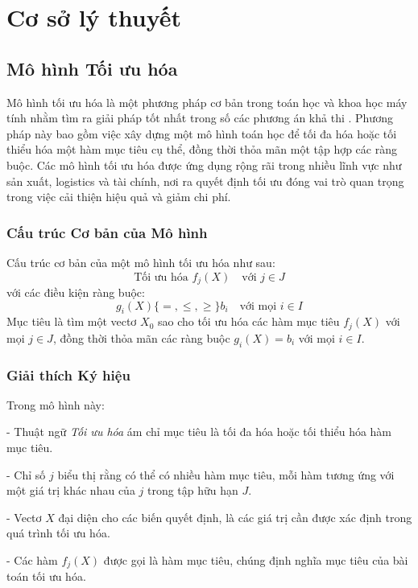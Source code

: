 \section{Cơ sở lý thuyết}
\subsection{Mô hình Tối ưu hóa}

\hspace{0.5cm}
Mô hình tối ưu hóa là một phương pháp cơ bản trong toán học và khoa học máy tính nhằm tìm ra giải pháp tốt nhất trong số các phương án khả thi \cite{GiordanoFoxHorton}. Phương pháp này bao gồm việc xây dựng một mô hình toán học để tối đa hóa hoặc tối thiểu hóa một hàm mục tiêu cụ thể, đồng thời thỏa mãn một tập hợp các ràng buộc. Các mô hình tối ưu hóa được ứng dụng rộng rãi trong nhiều lĩnh vực như sản xuất, logistics và tài chính, nơi ra quyết định tối ưu đóng vai trò quan trọng trong việc cải thiện hiệu quả và giảm chi phí.

\subsubsection{Cấu trúc Cơ bản của Mô hình}
\hspace{0.5cm}Cấu trúc cơ bản của một mô hình tối ưu hóa như sau:
\[
\text{Tối ưu hóa } f_j(X) \quad \text{với } j \in J
\]
với các điều kiện ràng buộc:
\[
g_i(X) \{=, \leq, \geq\} b_i \quad \text{với mọi } i \in I
\]
Mục tiêu là tìm một vectơ \( X_0 \) sao cho tối ưu hóa các hàm mục tiêu \( f_j(X) \) với mọi \( j \in J \), đồng thời thỏa mãn các ràng buộc \( g_i(X) = b_i \) với mọi \( i \in I \).

\subsubsection{Giải thích Ký hiệu}
\hspace{0.5cm}Trong mô hình này:

- Thuật ngữ \textit{Tối ưu hóa} ám chỉ mục tiêu là tối đa hóa hoặc tối thiểu hóa hàm mục tiêu.

- Chỉ số \( j \) biểu thị rằng có thể có nhiều hàm mục tiêu, mỗi hàm tương ứng với một giá trị khác nhau của \( j \) trong tập hữu hạn \( J \).

- Vectơ \( X \) đại diện cho các biến quyết định, là các giá trị cần được xác định trong quá trình tối ưu hóa.

- Các hàm \( f_j(X) \) được gọi là hàm mục tiêu, chúng định nghĩa mục tiêu của bài toán tối ưu hóa.

